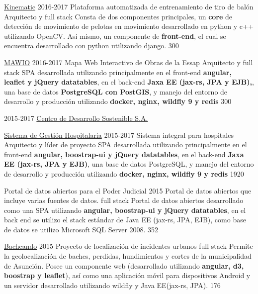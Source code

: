 \documentclass[]{friggeri-cv}
\begin{document}
\begin{entrylist}
{    \proyecto
        {\href{http://www.cds.com.py/productos/kinematics/}{Kinematic}}
        {2016-2017}
        {Plataforma automatizada de entrenamiento de tiro de balón}
        {Arquitecto y full stack}
        {Consta de dos componentes principales, un \textbf{core} de detección de movimiento de pelotas en movimiento desarrollado en python y c++ utilizando OpenCV. Así mismo, un componente de \textbf{front-end}, el cual se encuentra desarrollado con python utilizando django.}
        {300}
        
    \proyecto
        {\href{https://mawio.net/}{MAWIO}}
        {2016-2017}
        {Mapa Web Interactivo de Obras de la Essap}
        {Arquitecto y full stack}
        {SPA desarrollada utilizando principalmente en el front-end \textbf{angular, leaflet y jQuery datatables}, en el back-end \textbf{Jaxa EE (jax-rs, JPA y EJB),}, una base de datos \textbf{PostgreSQL con PostGIS}, y manejo del entorno de desarrollo y producción utilizando \textbf{docker, nginx, wildfly 9 y redis}}
        {300}
        
        
      }
      {}
    
  \entry
    {2015-2017}
    {\href{http://www.cds.com.py}{Centro de Desarrollo Sostenible S.A.}}
    {}
    {
    \proyecto
        {\href{http://www.cds.com.py/productos/sistemas-de-gestion/sistema-de-gestion-hospitalaria/}{Sistema de Gestión Hospitalaria}}
        {2015-2017}
        {Sistema integral para hospitales}
        {Arquitecto y líder de proyecto}
        {SPA desarrollada utilizando principalmente en el front-end 
        \textbf{angular, boostrap-ui y jQuery datatables}, en el back-end 
        \textbf{Jaxa EE (jax-rs, JPA y EJB)}, una base de datos PostgreSQL, 
        y manejo del entorno de desarrollo y producción utilizando 
        \textbf{docker, nginx, wildfly 9 y redis}}
        {1920}
        
    \proyecto
        {Portal de datos abiertos para el Poder Judicial}
        {2015}
        {Portal de datos abiertos que incluye varias fuentes de datos.}
        {full stack}
        {Portal de datos abiertos desarrollado como una SPA utilizando 
        \textbf{angular, boostrap-ui y jQuery datatables}, en el back end 
        se utilizo el stack estándar de Java EE (jax-rs, JPA, EJB), como base 
        de datos se utilizo Microsoft SQL Server 2008.}
        {352} 
        
    \proyecto
        {\href{http://bacheando.com/}{Bacheando}}
        {2015}
        {Proyecto de localización de incidentes urbanos}
        {full stack}
        {Permite la geolocalización de baches, perdidas, hundimientos y
            cortes de la municipalidad de Asunción.
            Posee un componente web (desarrollado utilizando 
            \textbf{angular, d3, boostrap y leaflet}), así como una 
            aplicación móvil para dispositivos Android y un servidor desarrollado 
            utilizando wildfly y Java EE(jax-rs, JPA).}
        {176} 
        
}
\end{entrylist}
\end{document}
